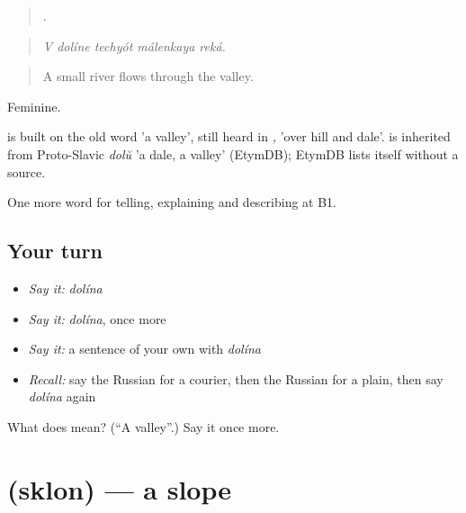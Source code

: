 \begin{quote}
    .
\end{quote}

\begin{quote}
\emph{V dolíne techyót málenkaya reká.}
\end{quote}

\begin{quote}
A small river flows through the valley.
\end{quote}

Feminine.

\begin{cousinweb}
\emph{} is built on the old word \emph{} 'a valley', still heard in \emph{ ,  } 'over hill and dale'. \emph{} is inherited from Proto-Slavic \emph{dolŭ} 'a dale, a valley' (EtymDB); EtymDB lists \emph{} itself without a source.
\end{cousinweb}

\begin{grammarlens}[title={What you've built}]
One more word for telling, explaining and describing at B1.
\end{grammarlens}

\subsection*{Your turn}
\begin{itemize}
\raggedright
  \item \emph{Say it:} \emph{dolína}
  \item \emph{Say it:} \emph{dolína}, once more
  \item \emph{Say it:} a sentence of your own with \emph{dolína}
  \item \emph{Recall:} say the Russian for a courier, then the Russian for a plain, then say \emph{dolína} again
\end{itemize}

\begin{tcolorbox}[breakable,colback=teal!4,colframe=teal!35!black,title={Before you move on}]
What does  mean? (\textquotedblleft{}A valley\textquotedblright{}.) Say it once more.
\end{tcolorbox}
\section[\texorpdfstring{\ru{склон} (sklon)}{склон (sklon)}]{ (sklon) — a slope}

